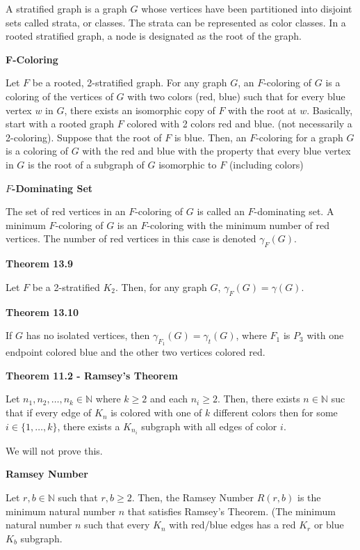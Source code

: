 \documentclass{article}
\begin{document}
    A stratified graph is a graph $G$ whose vertices have been partitioned into disjoint sets called strata, or classes.
    The strata can be represented as color classes.
    In a rooted stratified graph, a node is designated as the root of the graph.

\medskip\noindent\textbf{F-Coloring}

    Let $F$ be a rooted, 2-stratified graph.
    For any graph $G$, an $F$-coloring of $G$ is a coloring of the vertices of $G$ with two colors (red, blue) such that for every blue vertex $w$ in $G$, there exists an isomorphic copy of $F$ with the root at $w$.
    Basically, start with a rooted graph $F$ colored with 2 colors red and blue. (not necessarily a 2-coloring).
    Suppose that the root of $F$ is blue.
    Then, an $F$-coloring for a graph $G$ is a coloring of $G$ with the red and blue with the property that every blue vertex in $G$ is the root of a subgraph of $G$ isomorphic to $F$ (including colors)

\medskip\noindent\textbf{$F$-Dominating Set}

    The set of red vertices in an $F$-coloring of $G$ is called an $F$-dominating set.
    A minimum $F$-coloring of $G$ is an $F$-coloring with the minimum number of red vertices.
    The number of red vertices in this case is denoted $\gamma_F(G)$.

\medskip\noindent\textbf{Theorem 13.9}

    Let $F$ be a 2-stratified $K_2$.
    Then, for any graph $G$, $\gamma_F(G) = \gamma(G)$.

\medskip\noindent\textbf{Theorem 13.10}

    If $G$ has no isolated vertices, then $\gamma_{F_1}(G) = \gamma_t(G)$, where $F_1$ is $P_3$ with one endpoint colored blue and the other two vertices colored red.

\medskip\noindent\textbf{Theorem 11.2 - Ramsey's Theorem}

    Let $n_1, n_2, \hdots, n_k \in \mathbb N$ where $k \geq 2$ and each $n_i \geq 2$.
    Then, there exists $n \in \mathbb N$ suc that if every edge of $K_n$ is colored with one of $k$ different colors then for some $i \in \{1, \hdots, k\}$, there exists a $K_{n_i}$ subgraph with all edges of color $i$.
    
    We will not prove this.

\medskip\noindent\textbf{Ramsey Number}

    Let $r, b \in \mathbb N$ such that $r, b \geq 2$.
    Then, the Ramsey Number $R(r,b)$ is the minimum natural number $n$ that satisfies Ramsey's Theorem.
    (The minimum natural number $n$ such that every $K_n$ with red/blue edges has a red $K_r$ or blue $K_b$ subgraph.
\end{document}
